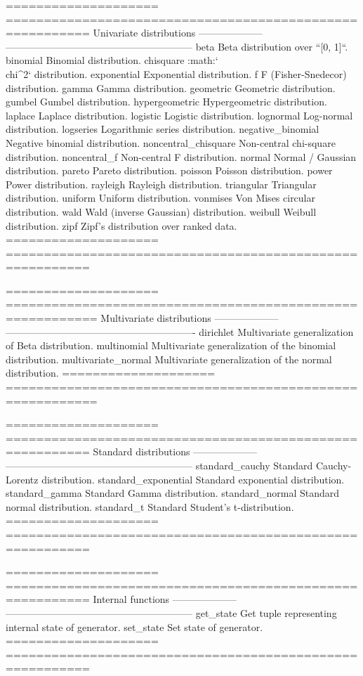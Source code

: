 \begin{DoxyVerb}
==================== =========================================================
Univariate
distributions
-------------------- ---------------------------------------------------------
beta                 Beta distribution over ``[0, 1]``.
binomial             Binomial distribution.
chisquare            :math:`\\chi^2` distribution.
exponential          Exponential distribution.
f                    F (Fisher-Snedecor) distribution.
gamma                Gamma distribution.
geometric            Geometric distribution.
gumbel               Gumbel distribution.
hypergeometric       Hypergeometric distribution.
laplace              Laplace distribution.
logistic             Logistic distribution.
lognormal            Log-normal distribution.
logseries            Logarithmic series distribution.
negative_binomial    Negative binomial distribution.
noncentral_chisquare Non-central chi-square distribution.
noncentral_f         Non-central F distribution.
normal               Normal / Gaussian distribution.
pareto               Pareto distribution.
poisson              Poisson distribution.
power                Power distribution.
rayleigh             Rayleigh distribution.
triangular           Triangular distribution.
uniform              Uniform distribution.
vonmises             Von Mises circular distribution.
wald                 Wald (inverse Gaussian) distribution.
weibull              Weibull distribution.
zipf                 Zipf's distribution over ranked data.
==================== =========================================================

==================== ==========================================================
Multivariate
distributions
-------------------- ----------------------------------------------------------
dirichlet            Multivariate generalization of Beta distribution.
multinomial          Multivariate generalization of the binomial distribution.
multivariate_normal  Multivariate generalization of the normal distribution.
==================== ==========================================================

==================== =========================================================
Standard
distributions
-------------------- ---------------------------------------------------------
standard_cauchy      Standard Cauchy-Lorentz distribution.
standard_exponential Standard exponential distribution.
standard_gamma       Standard Gamma distribution.
standard_normal      Standard normal distribution.
standard_t           Standard Student's t-distribution.
==================== =========================================================

==================== =========================================================
Internal functions
-------------------- ---------------------------------------------------------
get_state            Get tuple representing internal state of generator.
set_state            Set state of generator.
==================== =========================================================\end{DoxyVerb}
 

